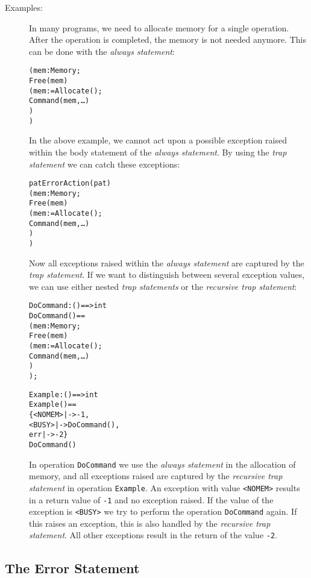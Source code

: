 \documentclass[\pformat,12pt]{article}
\begin{document}
\begin{description}
\item[Examples:] In many programs, we need to allocate memory for a
  single operation. After the operation is completed, the memory is not
  needed anymore. This can be done with the {\it always statement}:
  \begin{alltt}
    (  mem : Memory;
       Free(mem) 
      ( mem := Allocate();
        Command(mem, \ldots)
      )
    )
  \end{alltt}
  In the above example, we cannot act upon a possible exception raised
  within the body statement of the {\it always statement}. By using the
  {\it trap statement\/} we can catch these exceptions:
  \begin{alltt}
     pat  ErrorAction(pat) 
    (  mem : Memory;
       Free(mem) 
      ( mem := Allocate();
        Command(mem, \ldots)
      )
    )
  \end{alltt}
  Now all exceptions raised within the {\it always statement\/} are
  captured by the {\it trap statement}. If we want to distinguish between
  several exception values, we can use either nested {\it trap
    statements\/} or the {\it recursive trap statement}:
  \begin{alltt}
    DoCommand : () ==> int
    DoCommand () ==
    (  mem : Memory;
       Free(mem) 
      ( mem := Allocate();
        Command(mem, \ldots)
      )
    );

    Example : () ==> int
    Example () ==
    \{ <NOMEM> |->  -1,
      <BUSY>  |-> DoCommand(),
      err     |->  -2 \}
      DoCommand()
  \end{alltt}
  In operation {\tt DoCommand} we use the {\it always statement\/} in the
  allocation of memory, and all exceptions raised are captured by the {\it
    recursive trap statement\/} in operation {\tt Example}. An exception
  with value {\tt <NOMEM>} results in a return value of {\tt -1} and no
  exception raised. If the value of the exception is {\tt <BUSY>} we try to
  perform the operation {\tt DoCommand} again. If this raises an exception,
  this is also handled by the {\it recursive trap statement}. All other
  exceptions result in the return of the value {\tt -2}.  
\end{description}

\subsection{The Error Statement}
\end{document}
